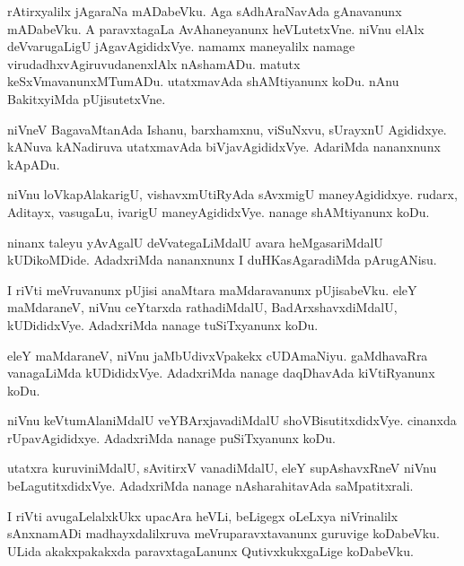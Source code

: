 \documentclass{article}
\begin{document}
\begin{mn}
rAtirxyalilx  jAgaraNa mADabeVku.  Aga  sAdhAraNavAda  gAnavanunx  mADabeVku.  A paravxtagaLa  
AvAhaneyanunx  heVLutetxVne. niVnu  elAlx  deVvarugaLigU  jAgavAgididxVye.  namamx  maneyalilx  
namage  virudadhxvAgiruvudanenxlAlx  nAshamADu.  matutx  keSxVmavanunxMTumADu.  utatxmavAda  
shAMtiyanunx  koDu.  nAnu  BakitxyiMda  pUjisutetxVne.
\end{mn}

\begin{mn}
niVneV  BagavaMtanAda  Ishanu,  barxhamxnu,  viSuNxvu,  sUrayxnU  Agididxye.  kANuva  
kANadiruva  utatxmavAda  biVjavAgididxVye.  AdariMda  nananxnunx  kApADu.
\end{mn}

\begin{mn}
niVnu  loVkapAlakarigU,  vishavxmUtiRyAda  sAvxmigU  maneyAgididxye.  rudarx,  
Aditayx,  vasugaLu,  ivarigU  maneyAgididxVye.  nanage  shAMtiyanunx  koDu.
\end{mn}

\begin{mn}
ninanx  taleyu  yAvAgalU  deVvategaLiMdalU  avara  heMgasariMdalU  kUDikoMDide.  
AdadxriMda  nananxnunx  I  duHKasAgaradiMda  pArugANisu.
\end{mn}

\begin{mn}
I  riVti  meVruvanunx  pUjisi  anaMtara  maMdaravanunx  pUjisabeVku.  eleY  maMdaraneV,  niVnu  
ceYtarxda  rathadiMdalU,  BadArxshavxdiMdalU,  kUDididxVye.  AdadxriMda  nanage  tuSiTxyanunx  koDu.
\end{mn}

\begin{mn}
eleY  maMdaraneV,  niVnu  jaMbUdivxVpakekx  cUDAmaNiyu.  gaMdhavaRra  vanagaLiMda  kUDididxVye.  
AdadxriMda  nanage  daqDhavAda  kiVtiRyanunx  koDu.
\end{mn}

\begin{mn}
niVnu  keVtumAlaniMdalU  veYBArxjavadiMdalU  shoVBisutitxdidxVye.  cinanxda  rUpavAgididxye.  
AdadxriMda  nanage  puSiTxyanunx  koDu.
\end{mn}

\begin{mn}
utatxra  kuruviniMdalU,  sAvitirxV  vanadiMdalU,  eleY  supAshavxRneV  niVnu  beLagutitxdidxVye.  
AdadxriMda  nanage  nAsharahitavAda  saMpatitxrali.  
\end{mn}

\begin{mn}
I riVti  avugaLelalxkUkx  upacAra  heVLi,  beLigegx oLeLxya  niVrinalilx  sAnxnamADi  
madhayxdalilxruva  meVruparavxtavanunx  guruvige  koDabeVku.  ULida  akakxpakakxda  
paravxtagaLanunx  QutivxkukxgaLige  koDabeVku.
\end{mn}
\end{document}
